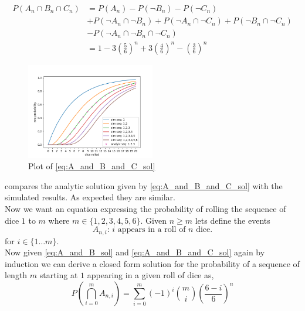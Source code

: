 \documentclass[12pt,a4paper]{article}
\begin{document}
\begin{align}
P(A_n \cap B_n \cap C_n)    &= P(A_n) - P(\neg B_n) - P(\neg C_n)\\
                            &+ P(\neg A_n \cap \neg B_n) + P(\neg A_n \cap \neg C_n) + P(\neg B_n \cap \neg C_n)\\ 
                            &- P(\neg A_n \cap \neg B_n \cap \neg C_n)\\
                            &= 1 - 3\left(\frac{5}{6}\right)^n + 3\left(\frac{4}{6}\right)^n - \left(\frac{3}{6}\right)^n
\label{eq:A_and_B_and_C_sol}
\end{align}
\begin{figure}[H]
    \centering
    \includegraphics[width=0.5\textwidth]{figs/compare_analytic_sim.png}
    \caption{Plot of \cref{eq:A_and_B_and_C_sol}}
    \label{fig:compare_analytic_sim}
\end{figure}
 compares the analytic solution given by \cref{eq:A_and_B_and_C_sol} with the simulated results. As expected they are similar.\\


Now we want an equation expressing the probability of rolling the sequence of dice $1$ to $m$ where $m\in\{1,2,3,4,5,6\}$. Given $n\geq m$ lets define the events
\begin{equation*}
A_{n,i} \text{: $i$ appears in a roll of $n$ dice.}
\end{equation*}
for $i \in \{1\ldots m\}$.\\

Now given \cref{eq:A_and_B_sol} and \cref{eq:A_and_B_and_C_sol} again by induction we can derive a closed form solution for the probability of a sequence of length $m$ starting at $1$ appearing in a given roll of dice as,
\begin{equation}
P\left(\bigcap_{i=0}^m A_{n,i}\right) = \sum_{i=0}^{m} (-1)^i \binom{m}{i}\left( \frac{6-i}{6} \right)^n
\label{eq:gen_sol}
\end{equation}
\end{document}
